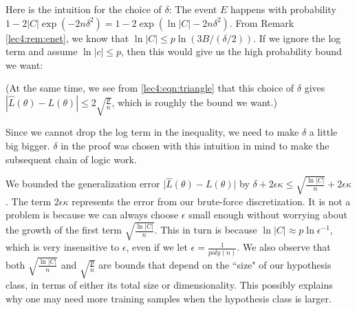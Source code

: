 \begin{remark}\label{lec4:rem:delta}
\sloppy Here is the intuition for the choice of $\delta$: The event $E$ happens with probability $1 - 2|C|\exp(-2n\delta^2) = 1 - 2 \exp(\ln{|C|} - 2n\delta^2)$. From Remark \ref{lec4:rem:enet}, we know that $\ln{|C|} \leq p \ln{ (3B / (\delta / 2)) }$. If we ignore the log term and assume $\ln{|c|} \leq p$, then this would give us the high probability bound we want:

(At the same time, we see from \eqref{lec4:eqn:triangle} that this choice of $\delta$ gives $|\hat L(\theta)- L(\theta)| \le 2 \sqrt{\frac{p}{n}}$, which is roughly the bound we want.)

Since we cannot drop the log term in the inequality, we need to make $\delta$ a little big bigger. $\delta$ in the proof was chosen with this intuition in mind to make the subsequent chain of logic work.
\end{remark}

\begin{remark}
We bounded the generalization error $\vert \hat L(\theta) - L(\theta) \vert$ by $\delta + 2\epsilon \kappa \leq \sqrt{\frac{\ln{\vert C \vert}}{n}} + 2\epsilon \kappa$. The term $2\epsilon \kappa$ represents the error from our brute-force discretization. It is not a problem is because we can always choose $\epsilon$ small enough without worrying about the growth of the first term $\sqrt{\frac{\ln{\vert C \vert}}{n}}$. This in turn is because $\ln{\vert C \vert} \approx p\ln{\epsilon^{-1}}$, which is very insensitive to $\epsilon$, even if we let $\epsilon = \frac{1}{poly(n)}$. We also observe that both $\sqrt{\frac{\ln{\vert C \vert}}{n}}$ and $\sqrt{\frac{p}{n}}$ are bounds that depend on the ``size" of our hypothesis class, in terms of either its total size or dimensionality. This possibly explains why one may need more training samples when the hypothesis class is larger.
\end{remark}
